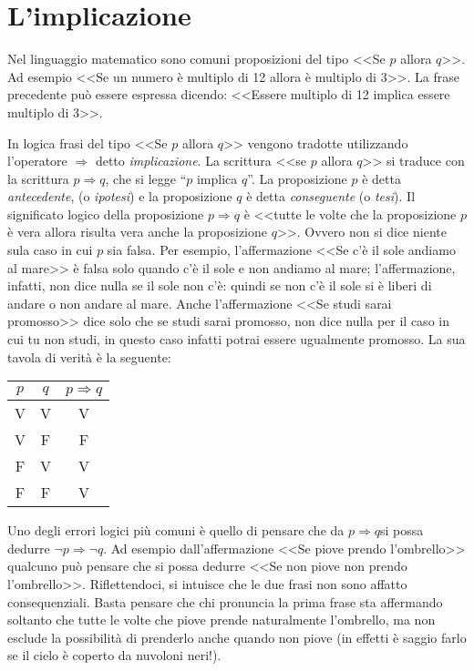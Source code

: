\vspazio\ovalbox{\risolvi \ref{ese:\thechapter.11}}

\section{L'implicazione}

Nel linguaggio matematico sono comuni proposizioni del tipo <<Se $p$ allora $q$>>. Ad esempio <<Se un numero è multiplo di 12 allora è multiplo di 3>>. La frase precedente può essere espressa dicendo:
<<Essere multiplo di 12 implica essere multiplo di 3>>.

In logica frasi del tipo <<Se $p$ allora $q$>> vengono tradotte utilizzando l'operatore $\Rightarrow$ detto \emph{implicazione}.
La scrittura <<se $p$ allora $q$>> si traduce con la scrittura $p\Rightarrow q$, che si legge ``$p$ implica $q$''.
La proposizione $p$ è detta \emph{antecedente}, (o \emph{ipotesi}) e la proposizione $q$ è detta \emph{conseguente} (o \emph{tesi}).
Il significato logico della proposizione $p\Rightarrow q$ è <<tutte le volte che la proposizione $p$ è vera allora risulta vera anche la proposizione $q$>>. Ovvero non si dice niente sula caso in cui $p$ sia falsa.
Per esempio, l'affermazione <<Se c'è il sole andiamo al mare>> è falsa solo quando c'è il sole e non andiamo al mare; l'affermazione, infatti, non dice nulla se il sole non c'è: quindi se non c'è il sole si è liberi di andare o non andare al mare. Anche l'affermazione <<Se studi sarai promosso>> dice solo che se studi sarai promosso, non dice nulla per il caso in cui tu non studi, in questo caso infatti potrai essere ugualmente promosso.
La sua tavola di verità è la seguente:
\begin{center}
 \begin{tabular*}{.2 \textwidth}{@{\extracolsep{\fill}}*{3}{c}}
 \toprule
$p$ &$q$ &$p\Rightarrow q$\\
\midrule
V & V & V \\
V & F & F \\
F & V & V \\
F & F & V \\
\bottomrule
 \end{tabular*}
\end{center}
Uno degli errori logici più comuni è quello di pensare che da $p\Rightarrow q$si possa dedurre $\neg p\Rightarrow \neg q$.
Ad esempio dall'affermazione <<Se piove prendo l'ombrello>> qualcuno può pensare che si possa dedurre <<Se non piove non prendo l'ombrello>>. Riflettendoci, si intuisce che le due frasi non sono affatto consequenziali. Basta pensare che chi pronuncia la prima frase sta affermando soltanto che tutte le volte che piove prende naturalmente l'ombrello, ma non esclude la possibilità di prenderlo anche quando non piove (in effetti è saggio farlo se il cielo è coperto da nuvoloni neri!).

